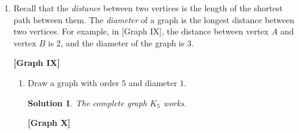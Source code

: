 \documentclass[11pt]{article}
\theoremstyle{solstyle}
\newtheorem*{solution}{Solution}
\newcommand{\glabel}[1]{\begin{center}\textbf{[Graph #1]}\end{center}}
\begin{document}
\begin{enumerate}[leftmargin=*]
\begin{enumerate}[label=(\alph*),leftmargin=*]
\begin{proof}
Checking the six rim edges and the six edges at the two corners, every edge joins a red vertex to a blue one. Walking along any cycle the color flips at each step, so returning to the start takes an even number of steps. Hence every cycle in Graph VI has even length.

Thus, since Graph VII has a $5$-cycle and Graph VI cannot, the two graphs are not isomorphic.
\end{proof}
\end{enumerate}

\item Recall that the \emph{distance} between two vertices is the length of the shortest path between them. The \emph{diameter} of a graph is the longest distance between two vertices. For example, in [Graph IX], the distance between vertex $A$ and vertex $B$ is $2$, and the diameter of the graph is $3$.

\begin{center}
\end{center}
\glabel{IX}

\begin{enumerate}[label=(\alph*),leftmargin=*]

\item Draw a graph with order $5$ and diameter $1$.

\begin{solution}
The complete graph $K_5$ works.
\end{solution}

\begin{center}
\end{center}
\glabel{X}


\end{enumerate}
\end{enumerate}
\end{document}
